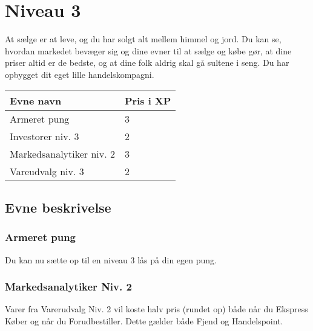 \chapter{Niveau 3}

At sælge er at leve, og du har solgt alt mellem himmel og jord. Du kan se, hvordan markedet bevæger sig og dine evner til at sælge og købe gør, at dine priser altid er de bedste, og at dine folk aldrig skal gå sultene i seng. Du har opbygget dit eget lille handelskompagni. 

\begin{table}[H]
    \centering
    \begin{tabular}{|p{}|p{}|}
    \rowcolor{cerulean!80}\hline
        Evne navn & Pris i XP \\\hline
        Armeret pung & 3\\\hline
        Investorer niv. 3& 2\\\hline
        Markedsanalytiker niv. 2& 3\\\hline
        Vareudvalg niv. 3& 2\\\hline
    \end{tabular}
\end{table}
\section{Evne beskrivelse}

\subsection{Armeret pung}
Du kan nu sætte op til en niveau 3 lås på din egen pung.\\



\subsection{Markedsanalytiker Niv. 2}
Varer fra Varerudvalg Niv. 2 vil koste halv pris (rundet op) både når du Ekspress Køber og når du Forudbestiller. Dette gælder både Fjend og Handelspoint.\\

